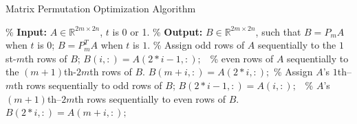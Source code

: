 \documentclass{book}
\theoremstyle{remark}
\begin{document}
\begin{algorithm}[htbp]
    \caption{Matrix Permutation Optimization Algorithm}
    \label{alg:Permutation Optimization}
    \begin{algorithmic}[1]
        \State \% \textbf{Input:} $ A\in \mathbb{R}^{2m\times 2n}$, $t$ is 0 or 1.
        \State \% \textbf{Output:} $B \in\mathbb{R}^{2m\times 2n}$, such that $B=P_mA$ when $t$ is $0$;  $B=P_m^TA$ when $t$ is $1$.
           \qquad\qquad\qquad\qquad \% 
          Assign odd rows of $A$ sequentially to the $1$st-$m$th rows of $B$; 
            \State $B(i, :) = A(2*i-1, :);$
            \qquad\ \% even rows of $A$ sequentially to the $(m+1)$th-$2m$th rows of $B$.
            \State $B(m+i, :) = A(2*i, :);$
          \End
        \Else  
             \qquad\qquad\qquad\qquad \% 
            Assign $A$'s $1$th--$m$th rows sequentially to odd rows of $B$;
            \State $B(2*i-1, :) = A(i, :);$ \qquad\ \%  $A$'s $(m+1)$th--$2m$th rows sequentially to even rows of $B$.
            \State $B(2*i, :) = A(m+i, :);$
          \End
        \End
    \End 
    \end{algorithmic}
\end{algorithm}
\end{document}
